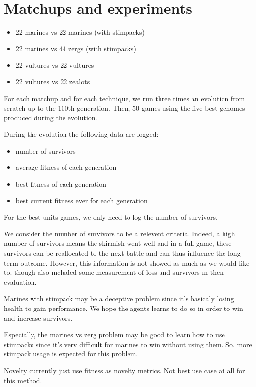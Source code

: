 \section{Matchups and experiments}

\begin{itemize}
    \item 22 marines vs 22 marines (with stimpacks)
    \item 22 marines vs 44 zergs (with stimpacks)
    \item 22 vultures vs 22 vultures
    \item 22 vultures vs 22 zealots
\end{itemize}

For each matchup and for each technique, we run three times an evolution
from scratch up to the 100th generation.
Then, 50 games using the five best genomes produced during the evolution.

During the evolution the following data are logged:
\begin{itemize}
    \item number of survivors
    \item average fitness of each generation
    \item best fitness of each generation
    \item best current fitness ever for each generation
\end{itemize}

For the best units games, we only need to log the number of survivors.

We consider the number of survivors to be a relevent criteria.
Indeed, a high number of survivors means the skirmish went well
and in a full game, these survivors can be reallocated to the
next battle and can thus influence the long term outcome.
However, this information is not showed as much as we would like to. \citet{SiSuBa14}
though also included some measurement of loss
and survivors in their evaluation.

Marines with stimpack may be a deceptive problem since
it's basicaly losing health to gain performance.
We hope the agents learns to do so in order to win and increase survivors.

Especially, the marines vs zerg problem may be good to
learn how to use stimpacks since it’s very difficult
for marines to win without using them. So, more stimpack usage
is expected for this problem.

Novelty currently just use fitness as novelty metrics. Not best use case at
all for this method.

